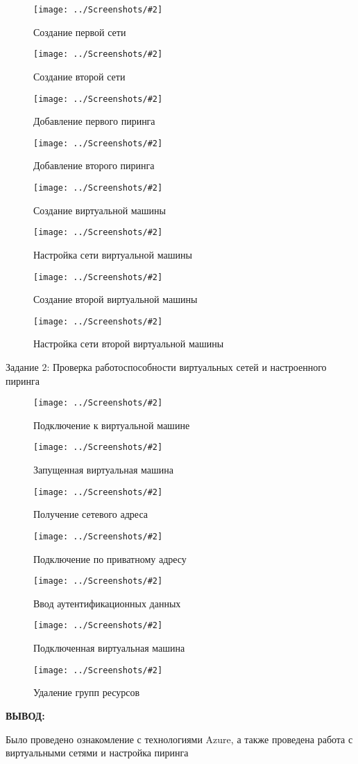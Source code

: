 \documentclass[14pt,a4paper]{extreport}
\newcommand{\screenshot}[2]{\begin{figure}[ht]%
\centering\texttt{[image: ../Screenshots/\#2]}%
\caption{#1}%
\label{picture#2}%
\end{figure}%
}
\newcommand{\header}[1]{%
{
\fontsize{16pt}{14pt}\selectfont
\begin{center}
\textbf{\MakeUppercase{#1}:}
\end{center}
}
}
\begin{document}
\screenshot{Создание первой сети}{1}
\screenshot{Создание второй сети}{2}
\screenshot{Добавление первого пиринга}{3}
\screenshot{Добавление второго пиринга}{4}
\screenshot{Создание виртуальной машины}{5}
\screenshot{Настройка сети виртуальной машины}{6}
\screenshot{Создание второй виртуальной машины}{7}
\screenshot{Настройка сети второй виртуальной машины}{8}

Задание 2: Проверка работоспособности виртуальных сетей и настроенного пиринга

\screenshot{Подключение к виртуальной машине}{9}
\screenshot{Запущенная виртуальная машина}{10}
\screenshot{Получение сетевого адреса}{11}
\screenshot{Подключение по приватному адресу}{12}
\screenshot{Ввод аутентификационных данных}{13}
\screenshot{Подключенная виртуальная машина}{14}
\screenshot{Удаление групп ресурсов}{15}

\clearpage
\header{Вывод}

Было проведено ознакомление с технологиями Azure, а также проведена работа с виртуальными сетями и настройка пиринга
\end{document}
